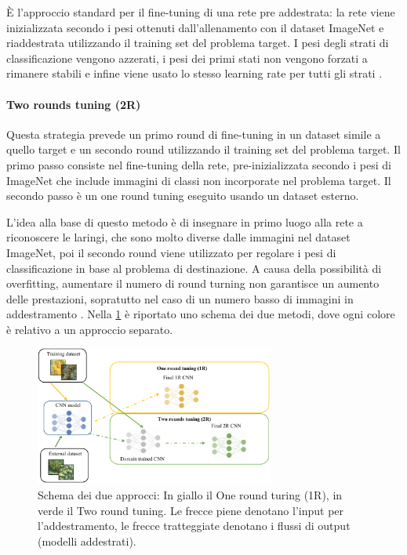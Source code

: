 È l'approccio standard per il fine-tuning di una rete pre addestrata: la rete viene inizializzata secondo i pesi ottenuti dall'allenamento con il dataset ImageNet e riaddestrata utilizzando il training set del problema target. I pesi degli strati di classificazione vengono azzerati, i pesi dei primi stati non vengono forzati a rimanere stabili e infine viene usato lo stesso learning rate per tutti gli strati \cite{lumini_plankton}. 

\paragraph{Two rounds tuning (2R)} \label{two-round-tuning}

Questa strategia prevede un primo round di fine-tuning in un dataset simile a quello target e un secondo round utilizzando il training set del problema target. Il primo passo consiste nel fine-tuning della rete, pre-inizializzata secondo i pesi di ImageNet che include immagini di classi non incorporate nel problema target. Il secondo passo è un one round tuning eseguito usando un  dataset esterno. 

L'idea alla base di questo metodo è di insegnare in primo luogo alla rete a riconoscere le laringi, che sono molto diverse dalle immagini nel dataset ImageNet, poi il secondo round viene utilizzato per regolare i pesi di classificazione in base al problema di destinazione. A causa della possibilità di \gls{overfitting}, aumentare il numero di round turning non garantisce un aumento delle prestazioni, sopratutto nel caso di un numero basso di immagini in addestramento \cite{lumini_plankton}. Nella \cref{fig:tl_2rt}  è riportato uno schema dei due metodi, dove ogni colore è relativo a un approccio separato. 

\begin{figure}[ht]
    \centering
    \includegraphics[width=0.7\textwidth]{transfer-learning/tl_2rt.pdf}
    \caption[Schema dei due approcci: In giallo il One round turing (1R), in verde il Two round tuning]{Schema dei due approcci: In giallo il One round turing (1R), in verde il Two round tuning. Le frecce piene denotano l'input per l'addestramento, le frecce tratteggiate denotano i flussi di output (modelli addestrati).}
    \label{fig:tl_2rt}
\end{figure}

